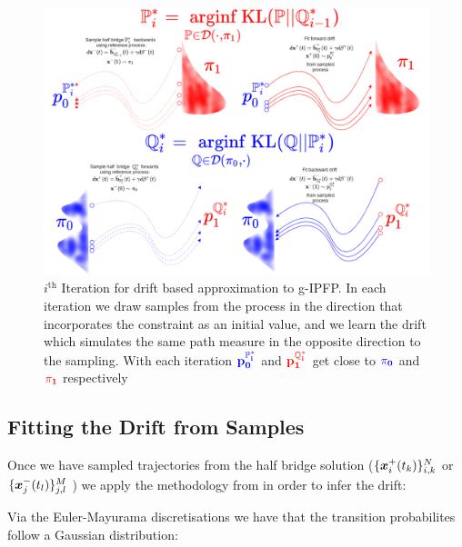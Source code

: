 \documentclass[a4paper,12pt,twoside,openright]{report}
\theoremstyle{definition}
\begin{document}
\begin{figure}
    \centering
    \includegraphics[width=\linewidth]{images/gp_IPFP.PNG}
    \caption{$i^{\text{th}}$ Iteration for drift based approximation to g-IPFP. In each iteration we draw samples from the process in the direction that incorporates the constraint as an initial value, and we learn the drift which simulates the same path measure in the opposite direction to the sampling. With each iteration $\mathbf{\color{blue}{p^{\P^{*}_i}_0}}$ and $\mathbf{\color{red}{p^{\Q^{*}_i}_1}}$ get close to $\mathbf{\color{blue}{\pi_0}}$ and $\mathbf{\color{red}{\pi_1}}$ respectively}
    \label{fig:gp_drift}
\end{figure}
\subsection{Fitting the Drift from Samples}

Once we have sampled trajectories from the half bridge solution ($\{\vx^{+}_i(t_k)\}_{i,k}^N$ or  $\{\vx^{-}_j(t_l)\}_{j,l}^M$ ) we  apply the methodology from \cite{ruttor2013approximate} in order to infer the drift:

Via the Euler-Mayurama discretisations we have that the transition probabilites follow a Gaussian distribution:
\end{document}
